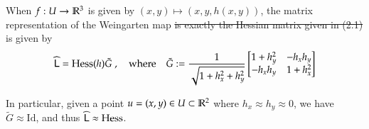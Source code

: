        	\begin{theorem}
        	When $f: U \to \mathbb{R}^3$ is given by $(x,y) \mapsto (x, y, h(x,y))$, the matrix
        	representation of the Weingarten map \sout{is exactly the Hessian matrix given in (2.1)} is given by
        	\begin{equation} \label{weinmatexactgraph}
        	\widehat{\mathsf{L}} = \mathrm{Hess}(h) \tilde{G} \;,\quad \mathrm{where} \quad
	        	\tilde{G} := \frac{1}{\sqrt{1+h_x^2 + h_y^2}}
	        	\begin{bmatrix}
		        	1 + h_y^2 & -h_x h_y \\
		        	-h_x h_y & 1 + h_x^2 \\
	        	\end{bmatrix} 
        	\end{equation}
        	
        	In particular, given a point $u = (x,y) \in U \subset \mathbb{R}^2$ where $h_x \approx h_y \approx 0$, we
        	have $\tilde{G} \approx \mathrm{Id}$, and thus $\widehat{\mathsf{L}} \approx \mathrm{Hess}$.
       	\end{theorem}
